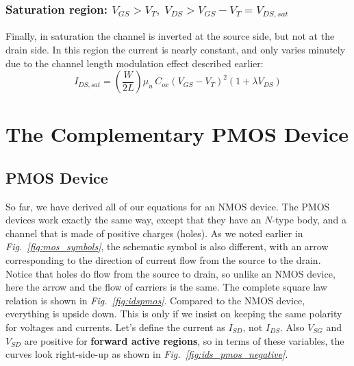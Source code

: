 \subsubsection{\textbf{Saturation region:} $V_{GS} > V_T,\;V_{DS} > V_{GS} - V_T = V_{DS,sat}$}
Finally, in saturation the channel is inverted at the source side, but not at the drain side.  In this region the current is nearly constant, and only varies minutely due to the channel length modulation effect described earlier:
    \begin{equation*}
        \boxed{ I_{DS,sat} = \left( \frac{W}{2L} \right) \mu_n\,C_{ox} {\left( V_{GS} - {V_T} \right)}^2 (1 + \lambda V_{DS}) }
        \label{eq:mosfet_ids}
    \end{equation*}
\section{The Complementary PMOS Device}
\subsection{PMOS Device}
So far, we have derived all of our equations for an NMOS device.  The PMOS devices work exactly the same way, except that they have an $N$-type body, and a channel that is made of positive charges (holes).  As we noted earlier in \emph{Fig.~\ref{fig:mos_symbols}}, the schematic symbol is also different, with an arrow corresponding to the direction of current flow from the source to the drain.  Notice that holes do flow from the source to drain, so unlike an NMOS device, here the arrow and the flow of carriers is the same.  The complete square law relation is shown in \emph{Fig.~\ref{fig:idspmos}}.  Compared to the NMOS device, everything is upside down. This is only if we insist on keeping the same polarity for voltages and currents.  Let's define the current as $I_{SD}$, not $I_{DS}$.   Also $V_{SG}$ and $V_{SD}$ are positive for \textbf{forward active regions}, so in terms of these variables, the curves look right-side-up as shown in \emph{Fig.~\ref{fig:ids_pmos_negative}}.

